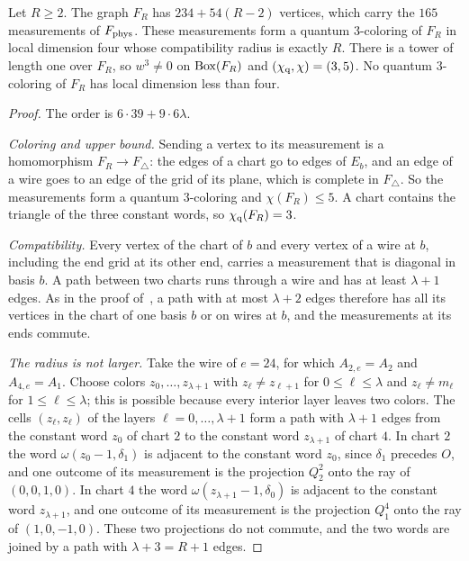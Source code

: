 \begin{theorem}\label{thm:FR}
Let $R\ge2$. The graph $F_R$ has $234+54(R-2)$ vertices, which carry the $165$ measurements of $F_{\rm phys}$. These measurements form a quantum $3$-coloring of $F_R$ in local dimension four whose compatibility radius is exactly $R$. There is a tower of length one over $F_R$, so $w^3\ne0$ on $\operatorname{Box}(F_R)$ and $(\chi_{\mathrm q},\chi)=(3,5)$. No quantum $3$-coloring of $F_R$ has local dimension less than four.
\end{theorem}
\begin{proof}
The order is $6\cdot39+9\cdot6\lambda$.

\emph{Coloring and upper bound.} Sending a vertex to its measurement is a homomorphism $F_R\to F_\triangle$: the edges of a chart go to edges of $E_b$, and an edge of a wire goes to an edge of the grid of its plane, which is complete in $F_\triangle$. So the measurements form a quantum $3$-coloring and $\chi(F_R)\le5$. A chart contains the triangle of the three constant words, so $\chi_{\mathrm q}(F_R)=3$.

\emph{Compatibility.} Every vertex of the chart of $b$ and every vertex of a wire at $b$, including the end grid at its other end, carries a measurement that is diagonal in basis $b$. A path between two charts runs through a wire and has at least $\lambda+1$ edges. As in the proof of~\cite[Lemma~2.2]{Z}, a path with at most $\lambda+2$ edges therefore has all its vertices in the chart of one basis $b$ or on wires at $b$, and the measurements at its ends commute.

\emph{The radius is not larger.} Take the wire of $e=24$, for which $A_{2,e}=A_2$ and $A_{4,e}=A_1$. Choose colors $z_0,\ldots,z_{\lambda+1}$ with $z_\ell\ne z_{\ell+1}$ for $0\le\ell\le\lambda$ and $z_\ell\ne m_\ell$ for $1\le\ell\le\lambda$; this is possible because every interior layer leaves two colors. The cells $(z_\ell,z_\ell)$ of the layers $\ell=0,\ldots,\lambda+1$ form a path with $\lambda+1$ edges from the constant word $z_0$ of chart $2$ to the constant word $z_{\lambda+1}$ of chart $4$. In chart $2$ the word $\omega(z_0-1,\delta_1)$ is adjacent to the constant word $z_0$, since $\delta_1$ precedes $O$, and one outcome of its measurement is the projection $Q^2_2$ onto the ray of $(0,0,1,0)$. In chart $4$ the word $\omega(z_{\lambda+1}-1,\delta_0)$ is adjacent to the constant word $z_{\lambda+1}$, and one outcome of its measurement is the projection $Q^4_1$ onto the ray of $(1,0,-1,0)$. These two projections do not commute, and the two words are joined by a path with $\lambda+3=R+1$ edges.


\end{proof}
